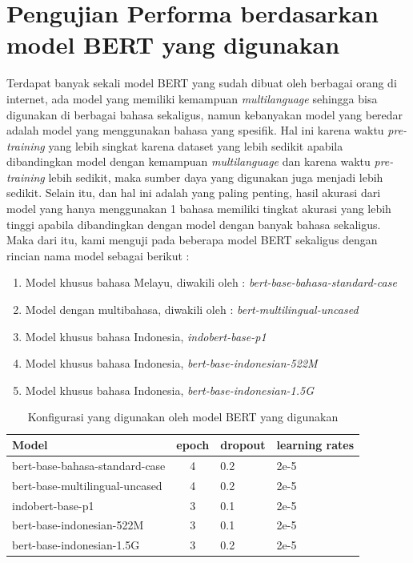 \section{Pengujian Performa berdasarkan model BERT yang digunakan}

Terdapat banyak sekali model BERT yang sudah dibuat oleh berbagai orang di internet, ada model yang memiliki kemampuan \textit{multilanguage} sehingga bisa digunakan di berbagai bahasa sekaligus, namun kebanyakan model yang beredar adalah model yang menggunakan bahasa yang spesifik. Hal ini karena waktu \textit{pre-training} yang lebih singkat karena dataset yang lebih sedikit apabila dibandingkan model dengan kemampuan \textit{multilanguage} dan karena waktu \textit{pre-training} lebih sedikit, maka sumber daya yang digunakan juga menjadi lebih sedikit. Selain itu, dan hal ini adalah yang paling penting, hasil akurasi dari model yang hanya menggunakan 1 bahasa memiliki tingkat akurasi yang lebih tinggi apabila dibandingkan dengan model dengan banyak bahasa sekaligus. Maka dari itu, kami menguji pada beberapa model BERT sekaligus dengan rincian nama model sebagai berikut :

\begin{enumerate}[nolistsep]
    \item Model khusus bahasa Melayu, diwakili oleh : \textit{bert-base-bahasa-standard-case}
    \item Model dengan multibahasa, diwakili oleh : \textit{bert-multilingual-uncased}
    \item Model khusus bahasa Indonesia, \textit{indobert-base-p1}
    \item Model khusus bahasa Indonesia, \textit{bert-base-indonesian-522M}
    \item Model khusus bahasa Indonesia, \textit{bert-base-indonesian-1.5G}
\end{enumerate}

\begin{table}
    \centering
    \caption{Konfigurasi yang digunakan oleh model BERT yang digunakan}
    \label{tab:multi_bert_config}
    \begin{tabular}{|p{.5\linewidth}|c|l|p{.12\linewidth} |}
        \hline
        Model                          & epoch & dropout & learning rates \\ \hline
        bert-base-bahasa-standard-case & 4     & 0.2     & 2e-5           \\ \hline
        bert-base-multilingual-uncased & 4     & 0.2     & 2e-5           \\ \hline
        indobert-base-p1               & 3     & 0.1     & 2e-5           \\ \hline
        bert-base-indonesian-522M      & 3     & 0.1     & 2e-5           \\ \hline
        bert-base-indonesian-1.5G      & 3     & 0.2     & 2e-5           \\ \hline
    \end{tabular}
\end{table}

